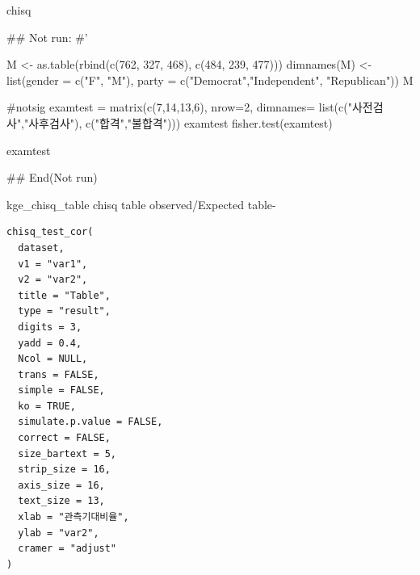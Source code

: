 \documentclass[a4paper]{book}
\begin{document}
%
\begin{Value}
chisq
\end{Value}
%
\begin{Examples}
\begin{ExampleCode}

\#\# Not run: 
#'


M <- as.table(rbind(c(762, 327, 468), c(484, 239, 477)))
dimnames(M) <- list(gender = c("F", "M"),
                    party = c("Democrat","Independent", "Republican"))
M %

#notsig
examtest  = matrix(c(7,14,13,6), nrow=2,
                   dimnames= list(c("사전검사","사후검사"),
                                  c("합격","불합격")))
examtest
fisher.test(examtest)

examtest %

## End(Not run)


\end{ExampleCode}
\end{Examples}
%
\begin{Description}
kge\_chisq\_table chisq table observed/Expected table-
\end{Description}
%
\begin{Usage}
\begin{verbatim}
chisq_test_cor(
  dataset,
  v1 = "var1",
  v2 = "var2",
  title = "Table",
  type = "result",
  digits = 3,
  yadd = 0.4,
  Ncol = NULL,
  trans = FALSE,
  simple = FALSE,
  ko = TRUE,
  simulate.p.value = FALSE,
  correct = FALSE,
  size_bartext = 5,
  strip_size = 16,
  axis_size = 16,
  text_size = 13,
  xlab = "관측기대비율",
  ylab = "var2",
  cramer = "adjust"
)
\end{verbatim}
\end{Usage}
%
\end{document}
